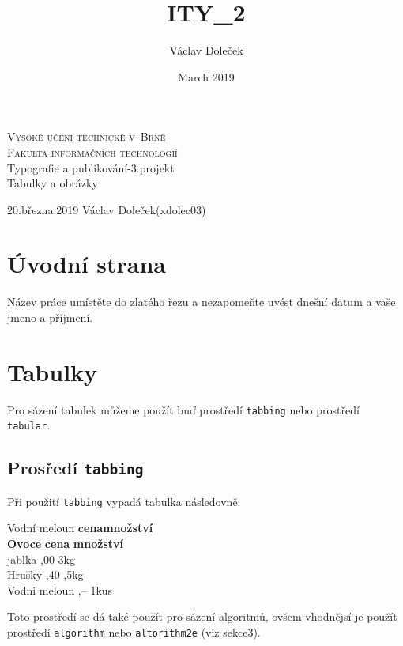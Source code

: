 \documentclass[a4paper,11pt]{article}
\title{ITY_2}
\author{Václav Doleček}
\date{March 2019}
\begin{document}
\begin{titlepage}
\begin{center}
    \Huge
    \textsc{Vysoké učení technické v~Brně}\\
    \huge
    \textsc{Fakulta informačních technologií}\\
    \Large
    Typografie a publikování-3.projekt\\
    \huge
    Tabulky a obrázky
\end{center}
{\large 20.března.2019 \hfill Václav Doleček(xdolec03)}

\end{titlepage}

\newpage

\section{Úvodní strana}
Název práce umístěte do zlatého řezu a nezapomeňte uvést dnešní datum a vaše jmeno a příjmení.

\section{Tabulky}
Pro sázení tabulek můžeme použít buď prostředí \verb|tabbing| nebo prostředí \verb|tabular|.

\subsection{Prosředí \texttt{tabbing}}
Při použití \verb|tabbing| vypadá tabulka následovně:
\begin{tabbing}%
Vodní meloun \quad \= \textbf{cena}\quad \= \textbf{množství} \kill \\
\textbf{Ovoce}\quad \> \textbf{cena}\quad \> \textbf{množství} \\
jablka ,00 \> 3kg
\\
Hrušky ,40 ,5kg
\\
Vodni meloun ,-- \> 1kus
\\
\end{tabbing}

Toto prostředí se dá také použít pro sázení algoritmů, ovšem vhodnějsí je použít prostředí \verb|algorithm| nebo \verb|altorithm2e| (viz sekce3).
\end{document}
